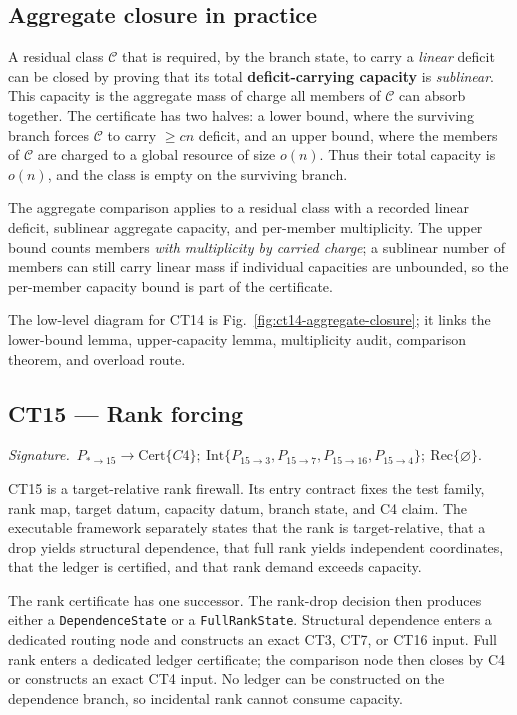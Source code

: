 \documentclass[
  11pt,
]{article}
\theoremstyle{definition}
\newcommand{\ctsignature}[1]{\par\noindent\emph{Signature.}\ #1\par\medskip}
\newcommand{\ctcert}[1]{\mathrm{Cert}\{#1\}}
\newcommand{\ctint}[1]{\mathrm{Int}\{#1\}}
\newcommand{\ctrec}[1]{\mathrm{Rec}\{#1\}}
\newcommand{\ctnone}{\varnothing}
\begin{document}
\subsection*{Aggregate closure in practice}

A residual class \(\mathcal C\) that is required, by the branch state,
to carry a \emph{linear} deficit can be closed by proving that its total
\textbf{deficit-carrying capacity} is \emph{sublinear}. This capacity is
the aggregate mass of charge all members of \(\mathcal C\) can absorb
together. The certificate has two halves: a lower bound, where the
surviving branch forces \(\mathcal C\) to carry \(\ge cn\) deficit, and
an upper bound, where the members of \(\mathcal C\) are charged to a
global resource of size \(o(n)\). Thus their total capacity is \(o(n)\),
and the class is empty on the surviving branch.

The aggregate comparison applies to a residual class with a recorded
linear deficit, sublinear aggregate capacity, and per-member
multiplicity.  The upper bound counts members \emph{with multiplicity by
carried charge}; a sublinear number of members can still carry linear
mass if individual capacities are unbounded, so the per-member capacity
bound is part of the certificate.

The low-level diagram for CT14 is Fig.~\ref{fig:ct14-aggregate-closure};
it links the lower-bound lemma, upper-capacity lemma, multiplicity audit,
comparison theorem, and overload route.



\subsection{CT15 --- Rank forcing}\label{ct:15}\label{rank-forcing-charge-only-independent-coordinates}
\ctsignature{\(P_{\ast\to15}\to \ctcert{C4};\ \ctint{P_{15\to3},P_{15\to7},P_{15\to16},P_{15\to4}};\ \ctrec{\ctnone}.\)}

CT15 is a target-relative rank firewall.  Its entry contract fixes the test
family, rank map, target datum, capacity datum, branch state, and C4 claim.
The executable framework separately states that the rank is target-relative,
that a drop yields structural dependence, that full rank yields independent
coordinates, that the ledger is certified, and that rank demand exceeds
capacity.

The rank certificate has one successor.  The rank-drop decision then produces
either a \texttt{DependenceState} or a \texttt{FullRankState}.  Structural
dependence enters a dedicated routing node and constructs an exact CT3, CT7,
or CT16 input.  Full rank enters a dedicated ledger certificate; the comparison
node then closes by C4 or constructs an exact CT4 input.  No ledger can be
constructed on the dependence branch, so incidental rank cannot consume
capacity.
\end{document}
